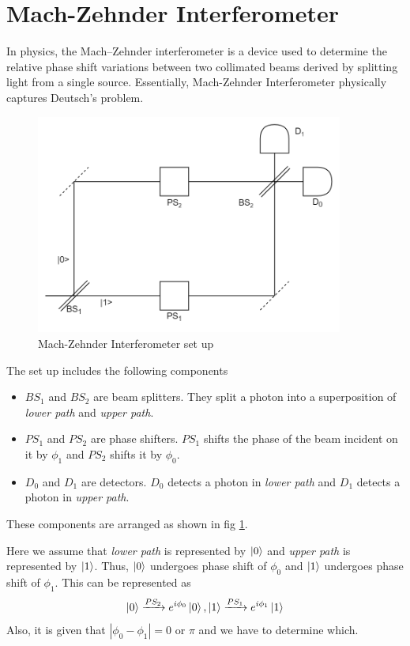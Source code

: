 \documentclass[11.5pt, paper=a4]{article}
\theoremstyle{definition}
\numberwithin{theorem}{section}
\begin{document}
\section{Mach-Zehnder Interferometer}
In physics, the Mach–Zehnder interferometer is a device used to determine the relative phase shift variations between two collimated beams derived by splitting light from a single source.\cite{Wikipedia} Essentially, Mach-Zehnder Interferometer physically captures Deutsch's problem.
\begin{figure}[H]
\centering
\includegraphics[width=0.9\textwidth]{Mach-Zehnder Interferometer.png}
\caption{Mach-Zehnder Interferometer set up}
\label{fig:1}
\end{figure}
The set up includes the following components
\begin{itemize}
\item $BS_1$ and $BS_2$ are beam splitters. They split a photon into a superposition of \emph{lower path} and \emph{upper path}.
\item $PS_1$ and $PS_2$ are phase shifters. $PS_1$ shifts the phase of the beam incident on it by $\phi_1$ and $PS_2$ shifts it by $\phi_0$.
\item $D_0$ and $D_1$ are detectors. $D_0$ detects a photon in \emph{lower path} and $D_1$ detects a photon in \emph{upper path}.
\end{itemize}

These components are arranged as shown in fig \ref{fig:1}.

Here we assume that \emph{lower path} is represented by $\ket0$ and \emph{upper path} is represented by $\ket1$. Thus, $\ket0$ undergoes phase shift of $\phi_0$ and $\ket1$ undergoes phase shift of $\phi_1$. This can be represented as
\begin{equation*}
\ket0\xrightarrow{PS_2}e^{i\phi_0}\ket0,\ket1\xrightarrow{PS_1}e^{i\phi_1}\ket1
\end{equation*}
Also, it is given that $\left|\phi_0-\phi_1\right|=0$ or $\pi$ and we have to determine which.
\end{document}
